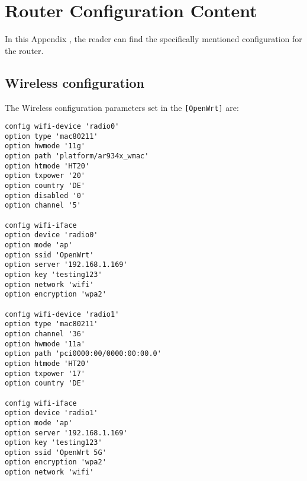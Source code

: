 
\chapter{Router Configuration Content}\label{app:ch:Routerconfig}

In this Appendix , the reader can find the specifically mentioned configuration for the router.

\section{Wireless configuration}\label{app:sec:wireless_config}
The Wireless configuration parameters set in the \verb|[OpenWrt]| are:
\begin{lstlisting}[frame=single]
config wifi-device 'radio0'
option type 'mac80211'
option hwmode '11g'
option path 'platform/ar934x_wmac'
option htmode 'HT20'
option txpower '20'
option country 'DE'
option disabled '0'
option channel '5'

config wifi-iface
option device 'radio0'
option mode 'ap'
option ssid 'OpenWrt'
option server '192.168.1.169'
option key 'testing123'
option network 'wifi'
option encryption 'wpa2'

config wifi-device 'radio1'
option type 'mac80211'
option channel '36'
option hwmode '11a'
option path 'pci0000:00/0000:00:00.0'
option htmode 'HT20'
option txpower '17'
option country 'DE'

config wifi-iface
option device 'radio1'
option mode 'ap'
option server '192.168.1.169'
option key 'testing123'
option ssid 'OpenWrt 5G'
option encryption 'wpa2'
option network 'wifi'
\end{lstlisting}
